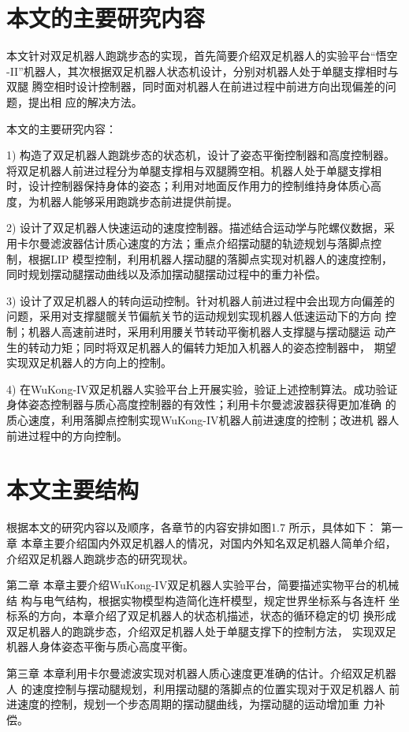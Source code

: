 \section{本文的主要研究内容}
本文针对双足机器人跑跳步态的实现，首先简要介绍双足机器人的实验平台“悟空
-II”机器人，其次根据双足机器人状态机设计，分别对机器人处于单腿支撑相时与双腿
腾空相时设计控制器，同时面对机器人在前进过程中前进方向出现偏差的问题，提出相
应的解决方法。

本文的主要研究内容：

1) 构造了双足机器人跑跳步态的状态机，设计了姿态平衡控制器和高度控制器。
将双足机器人前进过程分为单腿支撑相与双腿腾空相。机器人处于单腿支撑相
时，设计控制器保持身体的姿态；利用对地面反作用力的控制维持身体质心高
度，为机器人能够采用跑跳步态前进提供前提。

2) 设计了双足机器人快速运动的速度控制器。描述结合运动学与陀螺仪数据，采
用卡尔曼滤波器估计质心速度的方法；重点介绍摆动腿的轨迹规划与落脚点控
制，根据LIP 模型控制，利用机器人摆动腿的落脚点实现对机器人的速度控制，
同时规划摆动腿摆动曲线以及添加摆动腿摆动过程中的重力补偿。

3) 设计了双足机器人的转向运动控制。针对机器人前进过程中会出现方向偏差的
问题，采用对支撑腿髋关节偏航关节的运动规划实现机器人低速运动下的方向
控制；机器人高速前进时，采用利用腰关节转动平衡机器人支撑腿与摆动腿运
动产生的转动力矩；同时将双足机器人的偏转力矩加入机器人的姿态控制器中，
期望实现双足机器人的方向上的控制。

4) 在WuKong-IV双足机器人实验平台上开展实验，验证上述控制算法。成功验证
身体姿态控制器与质心高度控制器的有效性；利用卡尔曼滤波器获得更加准确
的质心速度，利用落脚点控制实现WuKong-IV机器人前进速度的控制；改进机
器人前进过程中的方向控制。

\section{本文主要结构}
根据本文的研究内容以及顺序，各章节的内容安排如图1.7 所示，具体如下：
第一章 本章主要介绍国内外双足机器人的情况，对国内外知名双足机器人简单介绍，
介绍双足机器人跑跳步态的研究现状。

第二章 本章主要介绍WuKong-IV双足机器人实验平台，简要描述实物平台的机械结
构与电气结构，根据实物模型构造简化连杆模型，规定世界坐标系与各连杆
坐标系的方向，本章介绍了双足机器人的状态机描述，状态的循环稳定的切
换形成双足机器人的跑跳步态，介绍双足机器人处于单腿支撑下的控制方法，
实现双足机器人身体姿态平衡与质心高度平衡。

第三章 本章利用卡尔曼滤波实现对机器人质心速度更准确的估计。介绍双足机器人
的速度控制与摆动腿规划，利用摆动腿的落脚点的位置实现对于双足机器人
前进速度的控制，规划一个步态周期的摆动腿曲线，为摆动腿的运动增加重
力补偿。

